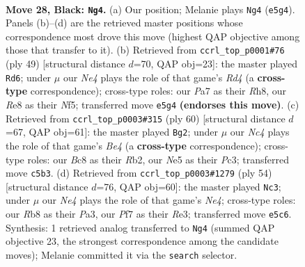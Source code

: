\documentclass[11pt]{article}
\begin{document}
\clearpage

\begin{figure}[p]\centering
\begin{subfigure}{0.46\textwidth}\centering
\resizebox{\linewidth}{!}{%
\newchessgame
\chessboard[
  setfen={1rb1r1k1/p1p2pp1/7p/2nPn2P/p3P3/2P5/6R1/R1B1KBN1 b Q - 0 28},
  showmover=false,
  pgfstyle=straightmove, color=movearrow, markmove={e5-g4}
]}
\caption{}
\end{subfigure}\hfill
\begin{subfigure}{0.46\textwidth}\centering
\resizebox{\linewidth}{!}{%
\newchessgame
\chessboard[
  setfen={7r/ppR5/5pk1/3r1n1p/1PB1pP2/P3b3/1B4PP/1K5R b - - 1 25},
  showmover=false,
  pgfstyle=straightmove, color=movearrow, markmove={d5-d6}
]}
\caption{}
\end{subfigure}
\\[4pt]
\begin{subfigure}{0.46\textwidth}\centering
\resizebox{\linewidth}{!}{%
\newchessgame
\chessboard[
  setfen={4brk1/6p1/2pb3r/1p6/pP1PB2P/N1P5/PR3P2/4R1K1 w - - 1 31},
  showmover=false,
  pgfstyle=straightmove, color=movearrow, markmove={e4-g2}
]}
\caption{}
\end{subfigure}\hfill
\begin{subfigure}{0.46\textwidth}\centering
\resizebox{\linewidth}{!}{%
\newchessgame
\chessboard[
  setfen={2r5/3nkppp/pr2b3/1p4P1/4N2P/PP2R3/2P2R2/2K2B2 w - - 3 28},
  showmover=false,
  pgfstyle=straightmove, color=movearrow, markmove={e4-c3}
]}
\caption{}
\end{subfigure}
\caption{\textbf{Move 28, Black: \texttt{Ng4}.} (a) Our position; Melanie plays \texttt{Ng4} (\texttt{e5g4}). Panels (b)--(d) are the retrieved master positions whose correspondence most drove this move (highest QAP objective among those that transfer to it). (b) Retrieved from \texttt{ccrl\_top\_p0001\#76} (ply 49) [structural distance $d$=70, QAP obj=23]: the master played \texttt{Rd6}; under $\mu$ our \emph{Ne4} plays the role of that game's \emph{Rd4} (a \textbf{cross-type} correspondence); cross-type roles: our \emph{P}a7 as their \emph{R}h8, our \emph{R}e8 as their \emph{N}f5; transferred move \texttt{e5g4} \textbf{(endorses this move)}. (c) Retrieved from \texttt{ccrl\_top\_p0003\#315} (ply 60) [structural distance $d$=67, QAP obj=61]: the master played \texttt{Bg2}; under $\mu$ our \emph{Nc4} plays the role of that game's \emph{Be4} (a \textbf{cross-type} correspondence); cross-type roles: our \emph{B}c8 as their \emph{R}b2, our \emph{N}e5 as their \emph{P}c3; transferred move \texttt{c5b3}. (d) Retrieved from \texttt{ccrl\_top\_p0003\#1279} (ply 54) [structural distance $d$=76, QAP obj=60]: the master played \texttt{Nc3}; under $\mu$ our \emph{Ne4} plays the role of that game's \emph{Ne4}; cross-type roles: our \emph{R}b8 as their \emph{P}a3, our \emph{P}f7 as their \emph{R}e3; transferred move \texttt{e5c6}. Synthesis: 1 retrieved analog transferred to \texttt{Ng4} (summed QAP objective 23, the strongest correspondence among the candidate moves); Melanie committed it via the \texttt{search} selector.}
\label{fig:thought-m55}
\end{figure}
\end{document}
